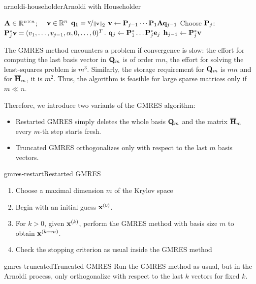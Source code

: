 \begin{Algorithm*}{arnoldi-householder}{Arnoldi with Householder}
  \begin{algorithmic}[1]
    \Require $\mathbf A\in\mathbb R^{n\times n}$; $\quad\mathbf v\in\mathbb R^n$
    \State $\mathbf q_1 = \nicefrac{\mathbf v}{\lVert\mathbf v\rVert}_2$
    \State $\mathbf v \gets \mathbf P_{j-1}\cdots\mathbf P_1\mathbf A\mathbf q_{j-1}$
    \State Choose $\mathbf P_j$: $\mathbf P_j^*\mathbf v = (v_1,\dots,v_{j-1},\alpha,0,\dots,0)^T$.
    \State $\mathbf q_j \gets \mathbf P_1^*\dots\mathbf P_j^*\mathbf e_j$
    \State $\mathbf h_{j-1} \gets \mathbf P_j^*\mathbf v$
    \EndFor
  \end{algorithmic}
\end{Algorithm*}

\begin{remark}
  The GMRES method encounters a problem if convergence is slow: the
  effort for computing the last basis vector in $\mathbf Q_m$ is of order
  $mn$, the effort for solving the least-squares problem is
  $m^3$. Similarly, the storage requirement for $\mathbf Q_m$ is $mn$ and
  for $\overline {\mathbf H}_m$, it is $m^2$. Thus, the algorithm is
  feasible for large sparse matrices only if $m\ll n$.

  Therefore, we introduce two variants of the GMRES algorithm:
  \begin{itemize}
  \item Restarted GMRES simply deletes the whole basis $\mathbf Q_m$ and the matrix $\overline{\mathbf H}_m$ every $m$-th step starts fresh.
  \item Truncated GMRES orthogonalizes only with respect to the last
    $m$ basis vectors.
  \end{itemize}
\end{remark}

\begin{Algorithm*}{gmres-restart}{Restarted GMRES}
  \begin{enumerate}
  \item Choose a maximal dimension $m$ of the Krylov space
  \item Begin with an initial guess $\mathbf x^{(0)}$.
  \item For $k>0$, given $\mathbf x^{(k)}$, perform the GMRES method with
    basis size $m$ to obtain $\mathbf x^{(k+m)}$.
  \item Check the stopping criterion as usual inside the GMRES method
  \end{enumerate}
\end{Algorithm*}

\begin{Algorithm*}{gmres-truncated}{Truncated GMRES}
  Run the GMRES method as usual, but in the Arnoldi process, only
  orthogonalize with respect to the last $k$ vectors for fixed $k$.
\end{Algorithm*}

